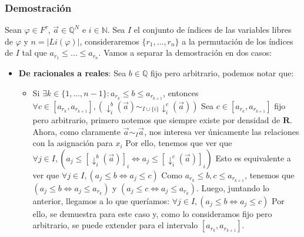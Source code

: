 \documentclass{article}
\begin{document}
\subsubsection*{Demostración}
Sean $\varphi\in F^\tau$, $\vec{a}\in\mathbb{Q}^N$ e $i\in\mathbb{N}$.
Sea $I$ el conjunto de índices de las variables libres de $\varphi$ y $n=|Li(\varphi)|$, consideraremos $\{r_1,\dots,r_n\}$ a la permutación de los índices de $I$ tal que $a_{r_1}\leq\dots\leq a_{r_n}$.
\newline
Vamos a separar la demostración en dos casos:
\begin{itemize}
  \item \textbf{De racionales a reales}: Sea $b\in\mathbb{Q}$ fijo pero arbitrario, podemos notar que:
        \begin{itemize}
          \item Si $\exists k\in\{1,\dots,n-1\}:a_{r_k}\leq b\leq a_{r_{k+1}}$, entonces $\forall c\in [a_{r_k},a_{r_{k+1}}],(\downarrow^b_i(\vec{a})\sim_{I\cup\{i\}}\downarrow^c_i(\vec{a}))$ \newline
                \hspace*{0.5cm} Sea $c\in [a_{r_k},a_{r_{k+1}}]$ fijo pero arbitrario, primero notemos que siempre existe por densidad de $\mathbf{R}$. \newline
                \hspace*{0.5cm} Ahora, como claramente $\vec{a}\sim_{I}\vec{a}$, nos interesa ver únicamente las relaciones con la asignación para $x_i$ \newline
                \hspace*{0.5cm} Por ello, tenemos que ver que $\forall j\in I,(a_j\leq[\downarrow^b_i(\vec{a})]_i\iff a_j\leq[\downarrow^c_i(\vec{a})]_i)$ \newline
                \hspace*{0.5cm} Esto es equivalente a ver que $\forall j\in I,(a_j\leq b\iff a_j\leq c)$ \newline
                \hspace*{0.5cm} Como $a_{r_k}\leq b,c\leq a_{r_{k+1}}$, tenemos que $(a_j\leq b\iff a_j\leq a_{r_k})$ y $(a_j\leq c\iff a_j\leq a_{r_k})$. \newline
                \hspace*{0.5cm} Luego, juntando lo anterior, llegamos a lo que queríamos: $\forall j\in I,(a_j\leq b\iff a_j\leq c)$ \newline
                \hspace*{0.5cm} Por ello, se demuestra para este caso y, como lo consideramos fijo pero arbitrario, se puede extender para el intervalo $[a_{r_k},a_{r_{k+1}}]$.

\end{itemize}
\end{itemize}
\end{document}
